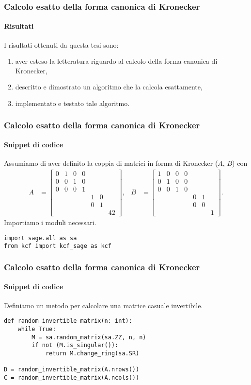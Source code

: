 \begin{frame}
	\frametitle{Calcolo esatto della forma canonica di Kronecker}
	\framesubtitle{Risultati}
	I risultati ottenuti da questa tesi sono:
	\begin{enumerate}
		\item aver esteso la letteratura riguardo al calcolo della forma canonica di Kronecker,
		\item descritto e dimostrato un algoritmo che la calcola esattamente,
		\item implementato e testato tale algoritmo.
	\end{enumerate}
\end{frame}


\begin{frame}[fragile]
	\frametitle{Calcolo esatto della forma canonica di Kronecker}
	\framesubtitle{Snippet di codice}
	Assumiamo di aver definito la coppia di matrici in forma di Kronecker ($A$, $B$) con
	\begin{align*}
		A &=
		\begin{bmatrix}
			0 & 1 & 0 & 0 \\
			0 & 0 & 1 & 0 \\
			0 & 0 & 0 & 1 \\
			& & & & 1 & 0 \\
			& & & & 0 & 1 \\
			& & & & & & 42
		\end{bmatrix}, &
		B &=
		\begin{bmatrix}
			1 & 0 & 0 & 0 \\
			0 & 1 & 0 & 0 \\
			0 & 0 & 1 & 0 \\
			& & & & 0 & 1 \\
			& & & & 0 & 0 \\
			& & & & & & 1
		\end{bmatrix}.
	\end{align*}
	Importiamo i moduli necessari.
	\begin{verbatim}
import sage.all as sa
from kcf import kcf_sage as kcf
	\end{verbatim}
\end{frame}


\begin{frame}[fragile]
	\frametitle{Calcolo esatto della forma canonica di Kronecker}
	\framesubtitle{Snippet di codice}
	Definiamo un metodo per calcolare una matrice casuale invertibile.
	\begin{verbatim}
def random_invertible_matrix(n: int):
	while True:
		M = sa.random_matrix(sa.ZZ, n, n)
		if not (M.is_singular()):
			return M.change_ring(sa.SR)

D = random_invertible_matrix(A.nrows())
C = random_invertible_matrix(A.ncols())
	\end{verbatim}
\end{frame}


